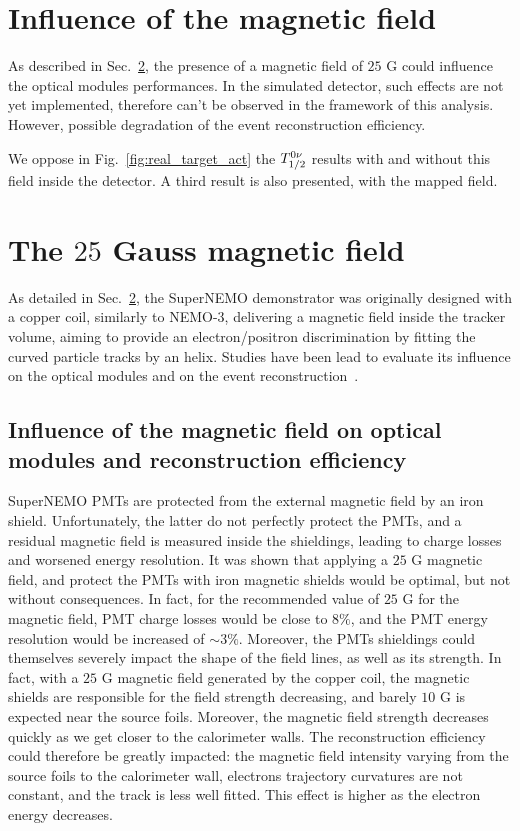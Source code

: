 \section{Influence of the magnetic field}

As described in Sec.~\ref{sec:magnetic_field}, the presence of a magnetic field of $25$ G could influence the optical modules performances.
In the simulated detector, such effects are not yet implemented, therefore can't be observed in the framework of this analysis.
However, possible degradation of the event reconstruction efficiency.


We oppose in Fig.~\ref{fig:real_target_act} the $T_{1/2}^{0\nu}$ results with and without this field inside the detector.
A third result is also presented, with the mapped field.


\section{The $25$ Gauss magnetic field}
\label{sec:magnetic_field}

As detailed in Sec.~\ref{sec:magnetic_field}, the SuperNEMO demonstrator was originally designed with a copper coil, similarly to NEMO-$3$, delivering a magnetic field inside the tracker volume, aiming to provide an electron/positron discrimination by fitting the curved particle tracks by an helix.
Studies have been lead to evaluate its influence on the optical modules and on the event reconstruction~\cite{CalvezThesis}\cite{internal:magnetic_field}.


\subsection{Influence of the magnetic field on optical modules and reconstruction efficiency}

SuperNEMO PMTs are protected from the external magnetic field by an iron shield.
Unfortunately, the latter do not perfectly protect the PMTs, and a residual magnetic field is measured inside the shieldings, leading to charge losses and worsened energy resolution.
It was shown that applying a $25$ G magnetic field, and protect the PMTs with iron magnetic shields would be optimal, but not without consequences.
In fact, for the recommended value of $25$ G for the magnetic field, PMT charge losses would be close to $8\%$, and the PMT energy resolution would be increased of $\sim 3\%$.
Moreover, the PMTs shieldings could themselves severely impact the shape of the field lines, as well as its strength.
In fact, with a $25$ G magnetic field generated by the copper coil, the magnetic shields are responsible for the field strength decreasing, and barely $10$ G is expected near the source foils.
Moreover, the magnetic field strength decreases quickly as we get closer to the calorimeter walls.
The reconstruction efficiency could therefore be greatly impacted:
the magnetic field intensity varying from the source foils to the calorimeter wall, electrons trajectory curvatures are not constant, and the track is less well fitted.
This effect is higher as the electron energy decreases.

